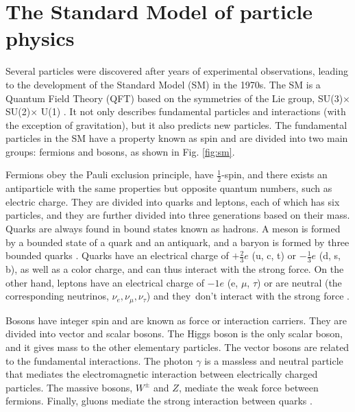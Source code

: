 \chapter{\leavevmode\newline The Standard Model of particle physics}
\label{chap:chapter_1}
Several particles were discovered after years of experimental observations, leading to the development of the Standard Model (SM) in the 1970s. The SM is a Quantum Field Theory (QFT) based on the symmetries of the Lie group, SU(3)$ \times$ SU(2)$ \times$ U(1) \cite{stiller2016full}. It not only describes fundamental particles and interactions (with the exception of gravitation), but it also predicts new particles. The fundamental particles in the SM have a property known as spin and are divided into two main groups: fermions and bosons, as shown in Fig. \ref{fig:sm}.

Fermions obey the Pauli exclusion principle, have $\frac{1}{2}$-spin, and there exists an antiparticle with the same properties but opposite quantum numbers, such as electric charge. They are divided into quarks and leptons, each of which has six particles, and they are further divided into three generations based on their mass.  Quarks are always found in bound states known as hadrons. A meson is formed by a bounded state of a quark and an antiquark, and a baryon is formed by three bounded quarks \cite{stiller2016full, fedi2016studies, grummer2021search}. Quarks have an electrical charge of $+\frac{2}{3}e$ (u, c, t) or $-\frac{1}{3}e$ (d, s, b), as well as a color charge, and can thus interact with the strong force. On the other hand, leptons have an electrical charge of $-1e$ (e, $\mu$, $\tau$) or are neutral (the corresponding neutrinos, $\nu_e, \nu_\mu, \nu_\tau$) and they don't interact with the strong force \cite{bonanomi2021response, bragagnolo2021measurement}.

Bosons have integer spin and are known as force or interaction carriers. They are divided into vector and scalar bosons. The Higgs boson is the only scalar boson, and it gives mass to the other elementary particles. The vector bosons are related to the fundamental interactions. The photon $\gamma$ is a massless and neutral particle that mediates the electromagnetic interaction between electrically charged particles. The massive bosons, $W^{\pm}$ and $Z$, mediate the weak force between fermions. Finally, gluons mediate the strong interaction between quarks \cite{grummer2021search, bragagnolo2021measurement}.

